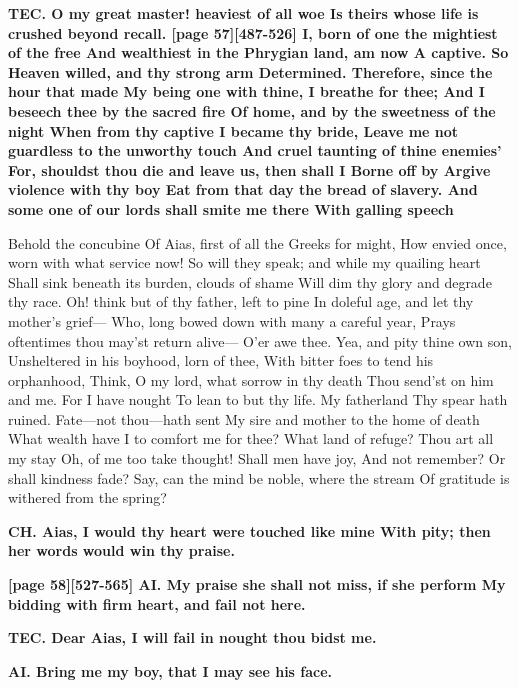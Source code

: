 \documentclass[11pt,letter]{book}
\begin{document}
\par \textbf{TEC. O my great master! heaviest of all woe Is theirs whose life is crushed beyond recall. [page 57][487-526] I, born of one the mightiest of the free And wealthiest in the Phrygian land, am now A captive. So Heaven willed, and thy strong arm Determined. Therefore, since the hour that made My being one with thine, I breathe for thee; And I beseech thee by the sacred fire Of home, and by the sweetness of the night When from thy captive I became thy bride, Leave me not guardless to the unworthy touch And cruel taunting of thine enemies’ For, shouldst thou die and leave us, then shall I Borne off by Argive violence with thy boy Eat from that day the bread of slavery. And some one of our lords shall smite me there With galling speech}
\par   Behold the concubine Of Aias, first of all the Greeks for might, How envied once, worn with what service now! So will they speak; and while my quailing heart Shall sink beneath its burden, clouds of shame Will dim thy glory and degrade thy race. Oh! think but of thy father, left to pine In doleful age, and let thy mother’s grief— Who, long bowed down with many a careful year, Prays oftentimes thou may’st return alive— O’er awe thee. Yea, and pity thine own son, Unsheltered in his boyhood, lorn of thee, With bitter foes to tend his orphanhood, Think, O my lord, what sorrow in thy death Thou send’st on him and me. For I have nought To lean to but thy life. My fatherland Thy spear hath ruined. Fate—not thou—hath sent My sire and mother to the home of death What wealth have I to comfort me for thee? What land of refuge? Thou art all my stay Oh, of me too take thought! Shall men have joy, And not remember? Or shall kindness fade? Say, can the mind be noble, where the stream Of gratitude is withered from the spring?

\par \textbf{CH. Aias, I would thy heart were touched like mine With pity; then her words would win thy praise.}
\par 

\par \textbf{[page 58][527-565] AI. My praise she shall not miss, if she perform My bidding with firm heart, and fail not here.}
\par 

\par \textbf{TEC. Dear Aias, I will fail in nought thou bidst me.}
\par 

\par \textbf{AI. Bring me my boy, that I may see his face.}
\par 
\end{document}
